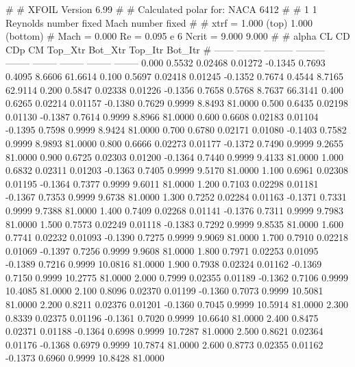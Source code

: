 #  
#       XFOIL         Version 6.99
#  
# Calculated polar for: NACA 6412                                       
#  
# 1 1 Reynolds number fixed          Mach number fixed         
#  
# xtrf =   1.000 (top)        1.000 (bottom)  
# Mach =   0.000     Re =     0.095 e 6     Ncrit =   9.000  9.000
#  
#   alpha    CL        CD       CDp       CM     Top_Xtr  Bot_Xtr  Top_Itr  Bot_Itr
#  ------ -------- --------- --------- -------- -------- -------- -------- --------
   0.000   0.5532   0.02468   0.01272  -0.1345   0.7693   0.4095   8.6606  61.6614
   0.100   0.5697   0.02418   0.01245  -0.1352   0.7674   0.4544   8.7165  62.9114
   0.200   0.5847   0.02338   0.01226  -0.1356   0.7658   0.5768   8.7637  66.3141
   0.400   0.6265   0.02214   0.01157  -0.1380   0.7629   0.9999   8.8493  81.0000
   0.500   0.6435   0.02198   0.01130  -0.1387   0.7614   0.9999   8.8966  81.0000
   0.600   0.6608   0.02183   0.01104  -0.1395   0.7598   0.9999   8.9424  81.0000
   0.700   0.6780   0.02171   0.01080  -0.1403   0.7582   0.9999   8.9893  81.0000
   0.800   0.6666   0.02273   0.01177  -0.1372   0.7490   0.9999   9.2655  81.0000
   0.900   0.6725   0.02303   0.01200  -0.1364   0.7440   0.9999   9.4133  81.0000
   1.000   0.6832   0.02311   0.01203  -0.1363   0.7405   0.9999   9.5170  81.0000
   1.100   0.6961   0.02308   0.01195  -0.1364   0.7377   0.9999   9.6011  81.0000
   1.200   0.7103   0.02298   0.01181  -0.1367   0.7353   0.9999   9.6738  81.0000
   1.300   0.7252   0.02284   0.01163  -0.1371   0.7331   0.9999   9.7388  81.0000
   1.400   0.7409   0.02268   0.01141  -0.1376   0.7311   0.9999   9.7983  81.0000
   1.500   0.7573   0.02249   0.01118  -0.1383   0.7292   0.9999   9.8535  81.0000
   1.600   0.7741   0.02232   0.01093  -0.1390   0.7275   0.9999   9.9069  81.0000
   1.700   0.7910   0.02218   0.01069  -0.1397   0.7256   0.9999   9.9608  81.0000
   1.800   0.7971   0.02253   0.01095  -0.1389   0.7216   0.9999  10.0816  81.0000
   1.900   0.7938   0.02324   0.01162  -0.1369   0.7150   0.9999  10.2775  81.0000
   2.000   0.7999   0.02355   0.01189  -0.1362   0.7106   0.9999  10.4085  81.0000
   2.100   0.8096   0.02370   0.01199  -0.1360   0.7073   0.9999  10.5081  81.0000
   2.200   0.8211   0.02376   0.01201  -0.1360   0.7045   0.9999  10.5914  81.0000
   2.300   0.8339   0.02375   0.01196  -0.1361   0.7020   0.9999  10.6640  81.0000
   2.400   0.8475   0.02371   0.01188  -0.1364   0.6998   0.9999  10.7287  81.0000
   2.500   0.8621   0.02364   0.01176  -0.1368   0.6979   0.9999  10.7874  81.0000
   2.600   0.8773   0.02355   0.01162  -0.1373   0.6960   0.9999  10.8428  81.0000

